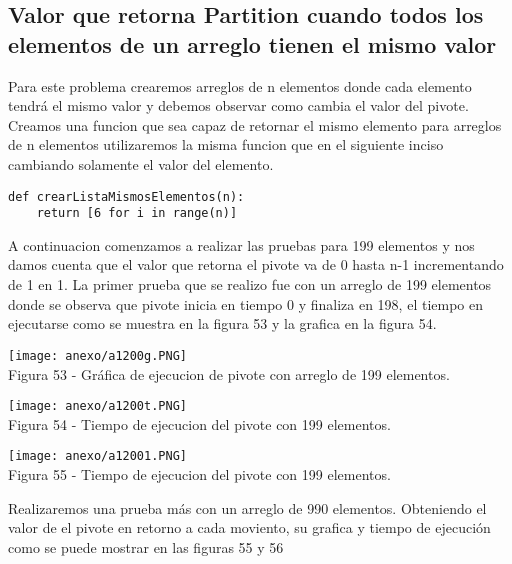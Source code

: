 \documentclass[12pt,twoside]{article}
\begin{document}
\subsection{Valor que retorna Partition cuando todos los elementos de un arreglo tienen el mismo valor}
Para este problema crearemos arreglos de n elementos donde cada elemento tendrá el mismo valor y debemos observar como cambia el valor del pivote.
Creamos una funcion que sea capaz de retornar el mismo elemento para arreglos de n elementos utilizaremos la misma funcion que en el siguiente inciso cambiando solamente el valor del elemento.
\begin{lstlisting}
def crearListaMismosElementos(n):
	return [6 for i in range(n)]
\end{lstlisting}
A continuacion comenzamos a realizar las pruebas para 199 elementos y nos damos cuenta que el valor que retorna el pivote va de 0 hasta n-1 incrementando de 1 en 1.
La primer prueba que se realizo fue con un arreglo de 199 elementos donde se observa que pivote inicia en tiempo 0 y finaliza en 198, el tiempo en ejecutarse como se
muestra en la figura 53 y la grafica en la figura 54.
\begin{center}
    \texttt{[image: anexo/a1200g.PNG]}\\
    Figura 53 - Gráfica de ejecucion de pivote con arreglo de 199 elementos.
\end{center}
\begin{center}
    \texttt{[image: anexo/a1200t.PNG]}\\
    Figura 54 - Tiempo de ejecucion del pivote con 199 elementos.
\end{center}
\begin{center}
    \texttt{[image: anexo/a12001.PNG]}\\
    Figura 55 - Tiempo de ejecucion del pivote con 199 elementos.
\end{center}

Realizaremos una prueba más con un arreglo de 990 elementos. Obteniendo el valor de el pivote en retorno a cada moviento, su grafica y tiempo de ejecuci\'on como se puede mostrar en las figuras 55 y 56
\end{document}
